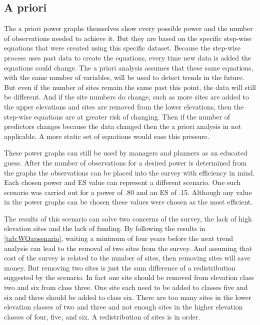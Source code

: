 \subsection{A priori}%

The a priori power graphs themselves show every possible power and the number of observations needed to achieve it.
But they are based on the specific step-wise equations that were created using this specific dataset.
Because the step-wise process uses past data to create the equations, every time new data is added the equations could change.
The a priori analysis assumes that these same equations, with the same number of variables, will be used to detect trends in the future.
But even if the number of sites remain the same past this point, the data will still be different.
And if the site numbers do change, such as more sites are added to the upper elevations and sites are removed from the lower elevations, then the step-wise equations are at greater risk of changing.
Then if the number of predictors changes because the data changed then the a priori analysis in not applicable.
A more static set of equations would ease this pressure.

These power graphs can still be used by managers and planners as an educated guess.
After the number of observations for a desired power is determined from the graphs the observations can be placed into the survey with efficiency in mind.
Each chosen power and ES value can represent a different scenario.
One such scenario was carried out for a power of .80 and an ES of .15.
Although any value in the power graphs can be chosen these values were chosen as the most efficient. 

The results of this scenario can solve two concerns of the survey, the lack of high elevation sites and the lack of funding.
By following the results in \autoref{tab:WQapsenario}, waiting a minimum of four years before the next trend analysis can lead to the removal of two sites from the survey.
And assuming that cost of the survey is related to the number of sites, then removing sites will save money.
But removing two sites is just the sum difference of a redistribution suggested by the scenario.
In fact one site should be removed from elevation class two and six from class three.
One site each need to be added to classes five and six and three should be added to class six.
There are too many sites in the lower elevation classes of two and three and not enough sites in the higher elevation classes of four, five, and six.
A redistribution of sites is in order.


